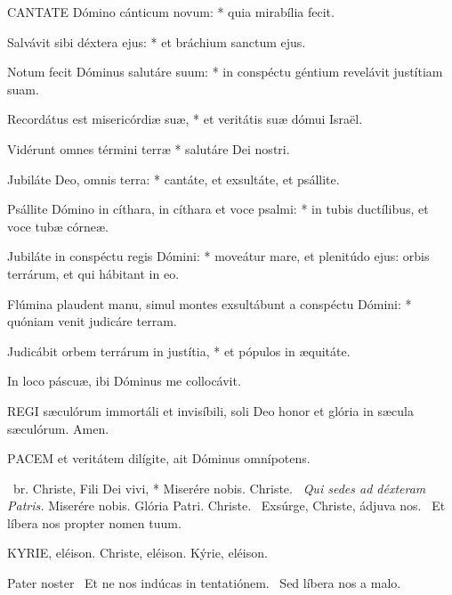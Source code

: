 
\lettrine[lines=2]{C}{ANTATE} Dómino cánticum novum: * quia mirabília fecit.

Salvávit sibi déxtera ejus: * et bráchium sanctum ejus.

Notum fecit Dóminus salutáre suum: * in conspéctu géntium revelávit justítiam suam.

Recordátus est misericórdiæ suæ, * et veritátis suæ dómui Israël.

Vidérunt omnes términi terræ * salutáre Dei nostri.

Jubiláte Deo, omnis terra: * cantáte, et exsultáte, et psállite.

Psállite Dómino in cíthara, in cíthara et voce psalmi: * in tubis ductílibus, et voce tubæ córneæ.

Jubiláte in conspéctu regis Dómini: * moveátur mare, et plenitúdo ejus: orbis terrárum, et qui hábitant in eo.

Flúmina plaudent manu, simul montes exsultábunt a conspéctu Dómini: * quóniam venit judicáre terram.

Judicábit orbem terrárum in justítia, * et pópulos in æquitáte.


 In loco páscuæ, ibi Dóminus me collocávit.



\lettrine[lines=2]{R}{EGI} sæculórum immortáli et invisíbili, soli Deo honor et glória in sæcula sæculórum. Amen.



\lettrine[lines=2]{P}{ACEM} et veritátem dilígite, ait Dóminus omnípotens.

\R\ br. Christe, Fili Dei vivi, * Miserére nobis. Christe. \V\ \textit{Qui sedes ad déxteram Patris.} Miserére nobis. Glória Patri. Christe. \V\ Exsúrge, Christe, ádjuva nos. \R\ Et líbera nos propter nomen tuum.


KYRIE, eléison. Christe, eléison. Kýrie, eléison.

Pater noster  \V\ Et ne nos indúcas in tentatiónem. \R\ Sed líbera nos a malo.

